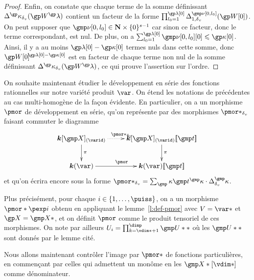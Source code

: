\begin{proof}
  Enfin, on constate que chaque terme de la somme définissant
  \( \pmnum^\derp_\dv ( \anyvp^\ip ) \) contient un facteur de la forme
  \(
    \prod_{\indi_0 = 1}^{\ip[0]}
    \pmnum_{1, \dv}^{\gmp\nu[0, \indi_0]}( \anyvp[0] )
  \). On peut supposer que \( \gmp\nu[0, \indi_0] \in \N \times
    \set{0}^{\anydim-1} \) car sinon ce facteur, donc le terme correspondant,
  est nul. De plus, on a \( \sum_{\indi_0 = 1}^{\ip[0]} \gmp\nu[0, \indi_0][0]
    \le \derp[0] \). Ainsi, il y a au moins \( \ip[0] - \derp[0] \) termes
  nuls dans cette somme, donc \( \anyvp[0]^{\!\!\ip[0] - \derp[0]} \) est en
  facteur de chaque terme non nul de la somme définissant \( \pmnum^\derp_\dv
    ( \anyvp^\ip ) \), ce qui prouve l'assertion sur l'ordre.
\end{proof}

On souhaite maintenant étudier le développement en série des fonctions
rationnelles sur notre variété produit \( \var \).  On étend les notations de
précédentes au cas multi-homogène de la façon évidente. En particulier, on a
un morphisme \( \pmor \) de développement en série, qu'on représente par des
morphismes \( \pmor*_\dv \) faisant commuter le diagramme
\begin{equation} \label{pmor*-prod}
  \xymatrix{
    \cdn[\vmp]_{(\varid)}                 \ar[d]^\pi  \ar@{.>}[r]^{\pmor*_\dv}
    & \cdn[\vmp]_{(\varid)} \series\psmp  \ar[d]^\pi
    \\ \cdn(\var)                                     \ar[r]^{\pmor}
    & \cdn(\var)\series\psmp
  }
\end{equation}
et qu'on écrira encore sous la forme \( \pmor*_\dv = \sum_\dermp \psmp^\dermp
  \cdot \pdiff^\dermp \).

Plus précisément, pour chaque \( \fct \in \set{1, \dots, \puiss} \), on a un
morphisme \( \pmor*\pexp\fct \) obtenu en appliquant le lemme~\ref{l:def-pmor}
avec \( V = \var* \) et \( \vp = \vmp* \), et on définit \( \pmor \) comme le
produit tensoriel de ces morphismes. On note par ailleurs \( \pden_\fct =
  \prod_{\ind=\vdim*+1}^{\dimp} \gmp\pden** \) où les \( \gmp\pden** \) sont
donnés par le lemme cité.

Nous allons maintenant contrôler l'image par \( \pmor* \) de fonctions
particulières, en commençant par celles qui admettent un monôme en les \(
  \vmp*[\vdim*] \) comme dénominateur.

